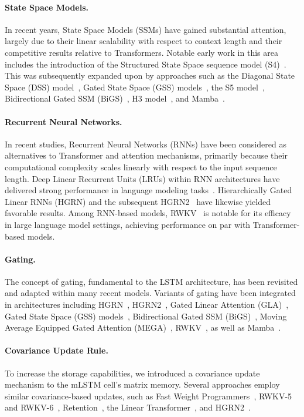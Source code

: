 \paragraph{State Space Models.} In recent years, State Space Models (SSMs) have gained substantial attention, largely due to their linear scalability with respect to context length and their competitive results relative to Transformers. Notable early work in this area includes the introduction of the Structured State Space sequence model (S4)~\citep{Gu:21}. This was subsequently expanded upon by approaches such as the Diagonal State Space (DSS) model~\citep{Gupta:22}, Gated State Space (GSS) models~\citep{Mehta:22}, the S5 model~\citep{Smith:22}, Bidirectional Gated SSM (BiGS)~\citep{Wang:22}, H3 model~\citep{Fu:23}, and Mamba~\citep{Gu:24arxiv}.

\paragraph{Recurrent Neural Networks.} In recent studies, Recurrent Neural Networks (RNNs) have been considered as alternatives to Transformer and attention mechanisms, primarily because their computational complexity scales linearly with respect to the input sequence length. Deep Linear Recurrent Units (LRUs) within RNN architectures have delivered strong performance in language modeling tasks~\citep{Orvieto:23, De:24arxiv}. Hierarchically Gated Linear RNNs (HGRN) \citep{Qin:23} and the subsequent HGRN2~\citep{Qin:24arxiv} have likewise yielded favorable results. Among RNN-based models, RWKV~\citep{Peng:23arxivshort, Peng:24arxivshort} is notable for its efficacy in large language model settings, achieving performance on par with Transformer-based models.

\paragraph{Gating.}
The concept of gating, fundamental to the LSTM architecture, has been revisited and adapted within many recent models. Variants of gating have been integrated in architectures including HGRN~\citep{Qin:23}, HGRN2~\citep{Qin:24arxiv}, Gated Linear Attention (GLA)~\citep{Yang:23arxiv}, Gated State Space (GSS) models~\citep{Mehta:22}, Bidirectional Gated SSM (BiGS)~\citep{Wang:22}, Moving Average Equipped Gated Attention (MEGA)~\citep{Ma:22}, RWKV~\citep{Peng:23arxivshort}, as well as Mamba~\citep{Gu:24arxiv}.

\paragraph{Covariance Update Rule.}
To increase the storage capabilities, we introduced a covariance update mechanism to the mLSTM cell's matrix memory. Several approaches employ similar covariance-based updates, such as Fast Weight Programmers~\citep{Schmidhuber:92ncfastweights,Schlag:21}, RWKV-5 and RWKV-6~\citep{Peng:24arxivshort}, Retention~\citep{Sun:23arxiv}, the Linear Transformer~\citep{Katharopoulos:20}, and HGRN2~\citep{Qin:24arxiv}.

